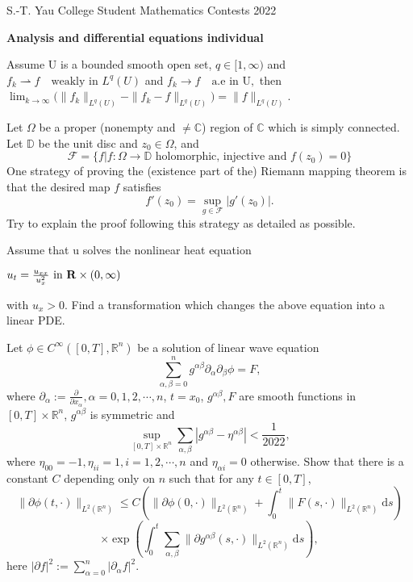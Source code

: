 \documentclass[12pt]{article}
\begin{document}
\begin{center}
S.-T. Yau College Student Mathematics Contests 2022\\

\vspace{0.1cm}

\Large {\bf Analysis and differential equations individual}

\vspace{0.1cm}




\end{center}

\vskip 1cm


 Assume U is a bounded smooth open set, $q\in[1,\infty)$ and
$f_{k}\rightharpoonup f \quad\mbox{weakly in } L^q(U)$
and
$f_{k}\rightarrow f\quad\mbox{a.e in U},$
then
$\lim_{k\rightarrow \infty}\big(\|f_k\|_{L^q(U)}-\|f_k-f\|_{L^q(U)}\big)=\|f\|_{L^q(U)}$.

\bigskip

 Let $\Omega$ be a proper (nonempty and $\ne\mathbb{C}$) region of $\mathbb{C}$ which is simply connected. Let $\mathbb{D}$ be the unit disc and $z_0\in\Omega$, and
$$\mathcal{F}=\{f| f:\Omega\to\mathbb{D} \text{ holomorphic, injective and $f(z_0)=0$}\}$$
One strategy of proving the (existence part of the) Riemann mapping theorem is that the desired map $f$ satisfies
$$f'(z_0)=\sup_{g\in\mathcal{F}}|g'(z_0)|.$$
Try to explain the proof following this strategy as detailed as possible.

\bigskip

 Assume that u solves the nonlinear heat equation

$u_{t} = \frac{u_{xx}}{u_{x}^{2}} \mbox{ in } {\bf R} \times (0, \infty)$

with $u_{x} > 0.$ Find a transformation which changes the above equation into a linear PDE.

\bigskip

 Let $\phi\in C^\infty([0,T],\mathbb{R}^n)$ be a solution of linear wave equation
$$\sum_{\alpha,\beta=0}^ng^{\alpha\beta}\partial_\alpha\partial_\beta\phi=F,$$
where $\partial_\alpha:=\frac{\partial}{\partial x_\alpha}, \alpha=0,1,2,\cdots,n$, $t=x_0$,  $g^{\alpha\beta}, F$ are smooth functions in $[0,T]\times\mathbb{R}^{n}$, $g^{\alpha\beta}$ is symmetric and
$$\sup_{[0,T]\times\mathbb{R}^n}\sum_{\alpha,\beta}|g^{\alpha\beta}-\eta^{\alpha\beta}|<\frac{1}{2022},$$
where $\eta_{00}=-1, \eta_{ii}=1, i=1,2,\cdots,n$ and $\eta_{\alpha i}=0$ otherwise. Show that there is a constant $C$ depending only on $n$ such that for any $t\in[0,T]$,
$$\|\partial\phi(t,\cdot)\|_{L^2(\mathbb{R}^n)}\le C\left(\|\partial\phi(0,\cdot)\|_{L^2(\mathbb{R}^n)}+\int_0^t\|F(s,\cdot)\|_{L^2(\mathbb{R}^n)}\mathrm{d}s\right)$$
$$\times\exp\left(\int_0^t\sum_{\alpha,\beta}\|\partial g^{\alpha\beta}(s,\cdot)\|_{L^2(\mathbb{R}^n)}\mathrm{d}s\right),$$
here $|\partial f|^2:=\sum_{\alpha=0}^n|\partial_\alpha f|^2$.

\bigskip
\end{document}
